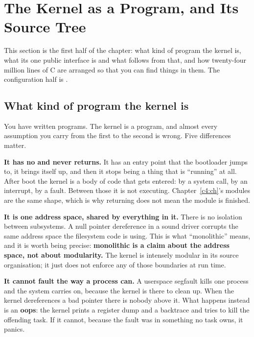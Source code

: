 
\section{The Kernel as a Program, and Its Source Tree}
\label{c3:app:a}

This section is the first half of the chapter: what kind of program the kernel is, what its one
public interface is and what follows from that, and how twenty-four million lines of C are arranged
so that you can find things in them. The configuration half is .

\subsection{What kind of program the kernel is}
\label{c3:app:a1}

You have written programs. The kernel is a program, and almost every assumption you carry from the
first to the second is wrong. Five differences matter.

\textbf{It has no  and never returns.} It has an entry point that the bootloader jumps
to, it brings itself up, and then it stops being a thing that is ``running'' at all. After boot the
kernel is a body of code that gets entered: by a system call, by an interrupt, by a fault. Between
those it is not executing. Chapter~\ref{c4:ch}'s modules are the same shape, which is why
 returning does not mean the module is finished.

\textbf{It is one address space, shared by everything in it.} There is no isolation between
subsystems. A null pointer dereference in a sound driver corrupts the same address space the
filesystem code is using. This is what ``monolithic'' means, and it is worth being precise:
\textbf{monolithic is a claim about the address space, not about modularity.} The kernel is
intensely modular in its source organisation; it just does not enforce any of those boundaries at
run time.

\textbf{It cannot fault the way a process can.} A userspace segfault kills one process and the
system carries on, because the kernel is there to clean up. When the kernel dereferences a bad
pointer there is nobody above it. What happens instead is an \textbf{oops}: the kernel prints a
register dump and a backtrace and tries to kill the offending task. If it cannot, because the fault
was in something no task owns, it panics.

